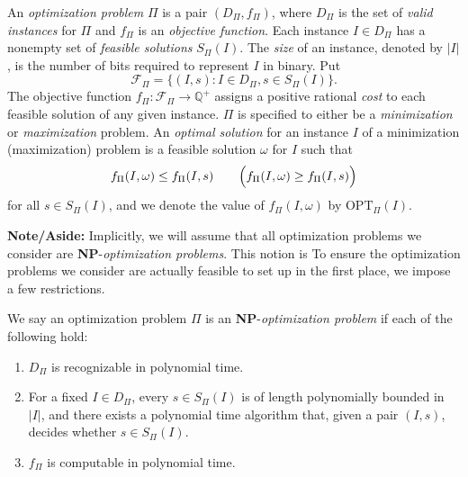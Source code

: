 \documentclass{article}
\newcommand{\Q}{\mathbb{Q}}
\newenvironment{definition}[2][Definition]{\begin{trivlist}
\item[\hskip \labelsep {\bfseries #1}\hskip \labelsep {\hspace{-1ex}\bfseries #2.}]}{\end{trivlist}}
\begin{document}
\begin{definition}{ (Optimization Problem)}{}
    An \textit{optimization problem} $\Pi$ is a pair $(D_\Pi, f_\Pi)$, where $D_\Pi$ is the set of \textit{valid instances} for $\Pi$ and $f_\Pi$ is an \textit{objective function}. Each instance $I \in D_\Pi$ has a nonempty set of \textit{feasible solutions} $S_\Pi(I)$. The \textit{size} of an instance, denoted by $|I|$, is the number of bits required to represent $I$ in binary. Put
    \[
    \mathcal{F}_\Pi = \{(I,s) : I \in D_\Pi, s \in S_\Pi(I)\}.
    \]
    The objective function $f_\Pi: \mathcal{F}_\Pi \to \Q^+$ assigns a positive rational \textit{cost} to each feasible solution of any given instance. $\Pi$ is specified to either be a \textit{minimization} or \textit{maximization} problem. An \textit{optimal solution} for an instance $I$ of a minimization (maximization) problem is a feasible solution $\omega$ for $I$ such that
    \[
    f_\Pi(I,\omega) \leq f_\Pi(I,s) \qquad \Bigl( f_\Pi(I,\omega) \geq f_\Pi(I,s) \Bigr)
    \]
    for all $s \in S_\Pi(I)$, and we denote the value of $f_\Pi(I,\omega)$ by $\text{OPT}_\Pi(I)$.
\end{definition}

\noindent\textbf{Note/Aside:} Implicitly, we will assume that all optimization problems we consider are \textbf{NP}-\textit{optimization problems}. This notion is To ensure the optimization problems we consider are actually feasible to set up in the first place, we impose a few restrictions.

\begin{definition}{ (NP-optimization Problem)}{}
    We say an optimization problem $\Pi$ is an \textbf{NP}-\textit{optimization problem} if each of the following hold:\vspace{3pt}
    \begin{enumerate}
        \item[(i)] $D_\Pi$ is recognizable in polynomial time.\vspace{3pt}
        \item[(ii)] For a fixed $I \in D_\Pi$, every $s \in S_\Pi(I)$ is of length polynomially bounded in $|I|$, and there exists a polynomial time algorithm that, given a pair $(I,s)$, decides whether $s \in S_\Pi(I)$.\vspace{3pt}
        \item[(iii)] $f_\Pi$ is computable in polynomial time.
    \end{enumerate}
\end{definition}
\end{document}
